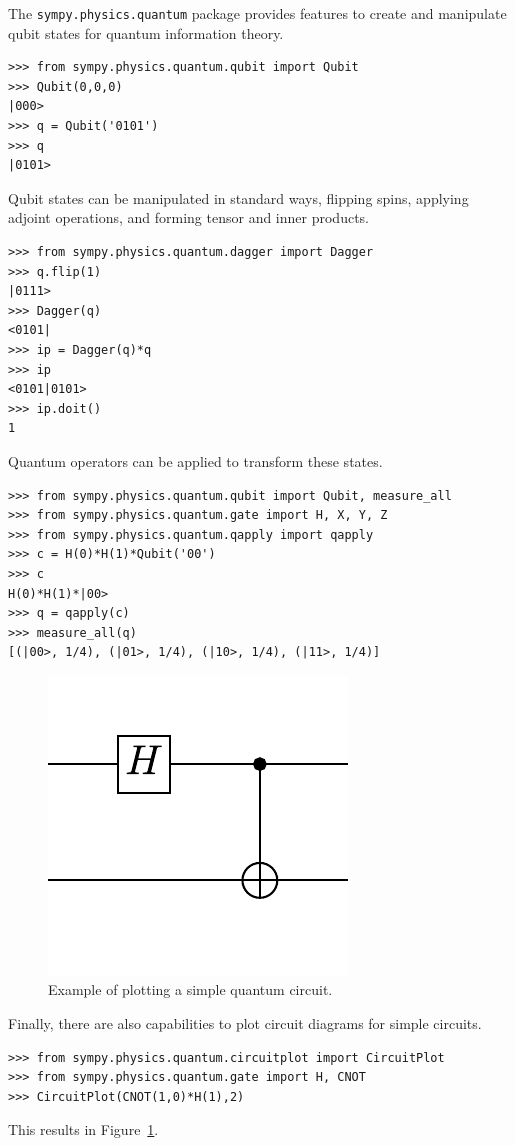 The \verb|sympy.physics.quantum| package provides features to create and manipulate qubit states for quantum information theory.
\begin{verbatim}
>>> from sympy.physics.quantum.qubit import Qubit
>>> Qubit(0,0,0)
|000>
>>> q = Qubit('0101')
>>> q
|0101>
\end{verbatim}
Qubit states can be manipulated in standard ways, flipping spins, applying adjoint operations, and forming tensor and inner products.
\begin{verbatim}
>>> from sympy.physics.quantum.dagger import Dagger
>>> q.flip(1)
|0111>
>>> Dagger(q)
<0101|
>>> ip = Dagger(q)*q
>>> ip
<0101|0101>
>>> ip.doit()
1
\end{verbatim}
Quantum operators can be applied to transform these states.
\begin{verbatim}
>>> from sympy.physics.quantum.qubit import Qubit, measure_all
>>> from sympy.physics.quantum.gate import H, X, Y, Z
>>> from sympy.physics.quantum.qapply import qapply
>>> c = H(0)*H(1)*Qubit('00')
>>> c
H(0)*H(1)*|00>
>>> q = qapply(c)
>>> measure_all(q)
[(|00>, 1/4), (|01>, 1/4), (|10>, 1/4), (|11>, 1/4)]
\end{verbatim}

\begin{figure}[htbp]
\begin{center}
\includegraphics[scale=0.75]{images/circuitplot-example}
\caption{Example of plotting a simple quantum circuit.}
\label{fig-circuitplot-example}
\end{center}
\end{figure}

Finally, there are also capabilities to plot circuit diagrams for simple circuits.
\begin{verbatim}
>>> from sympy.physics.quantum.circuitplot import CircuitPlot
>>> from sympy.physics.quantum.gate import H, CNOT
>>> CircuitPlot(CNOT(1,0)*H(1),2)
\end{verbatim}
This results in Figure~\ref{fig-circuitplot-example}.
